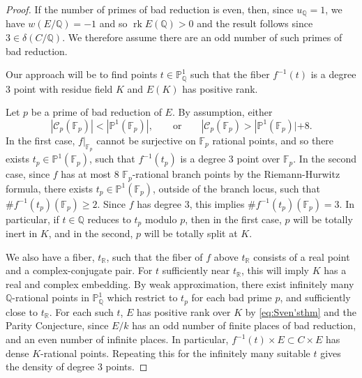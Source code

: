\documentclass[a4paper,11pt]{amsart}
\theoremstyle{plain}
\theoremstyle{remark}
\renewcommand{\P}{\mathbb{P}}
\newcommand{\rk}{\operatorname{rk}}
\newcommand{\dendegs}{\delta}
\begin{document}
\begin{proof}
If the number of primes of bad reduction is even, then, since \(u_{\mathbb{Q}} = 1\), we have \(w(E/\mathbb{Q}) = -1\) and so \(\rk E(\mathbb{Q}) > 0\) and the result follows since \(3 \in \dendegs(C/\mathbb{Q})\). 
We therefore assume there are an odd number of such primes of bad reduction. 

Our approach will be to find points $t \in \mathbb{P}^1_\mathbb{Q}$ such that the fiber $f^{-1}(t)$ is a degree \(3\) point with residue field \(K\) and $E(K)$ has positive rank.

Let \(p\) be a prime of bad reduction of $E$.  By assumption, either \[|\mathcal{C}_p(\mathbb{F}_p)| < |\mathbb{P}^1(\mathbb{F}_p)|, \qquad \text{or} \qquad |\mathcal{C}_p(\mathbb{F}_p) > |\mathbb{P}^1(\mathbb{F}_p)| + 8 .\] 
In the first case, $f|_{\mathbb{F}_p}$ cannot be surjective on $\mathbb{F}_p$ rational points, and so there exists \(t_p \in \P^1(\mathbb{F}_p)\), such that $f^{-1}(t_p)$ is a degree 3 point over $\mathbb{F}_p$. 
In the second case, since $f$ has at most 8 \(\mathbb{F}_p\)-rational branch points by the Riemann-Hurwitz formula, there exists \(t_p \in \P^1(\mathbb{F}_p)\), outside of the branch locus, such that \(\#f^{-1}(t_p)(\mathbb{F}_p) \geq 2\). Since $f$ has degree 3, this implies \(\#f^{-1}(t_p)(\mathbb{F}_p) = 3\). In particular, if $t \in \mathbb{Q}$ reduces to $t_p$ modulo $p$, then in the first case, $p$ will be totally inert in $K$, and in the second, $p$ will be totally split at $K$.

We also have a fiber, $t_{\mathbb{R}}$, such that the fiber of $f$ above $t_{\mathbb{R}}$ consists of a real point and a complex-conjugate pair. For $t$ sufficiently near $t_{\mathbb{R}}$, this will imply $K$ has a real and complex embedding.
By weak approximation, there exist infinitely many $\mathbb{Q}$-rational points in $\mathbb{P}^1_\mathbb{Q}$ which restrict to $t_p$ for each bad prime $p$, and sufficiently close to $t_{\mathbb{R}}$.
For each such $t$, $E$ has positive rank over $K$ by \eqref{eq:Sven'sthm} and the Parity Conjecture, since $E / k$ has an odd number of finite places of bad reduction, and an even number of infinite places. In particular, $f^{-1}(t) \times E \subset C \times E$ has dense $K$-rational points. Repeating this for the infinitely many suitable $t$ gives the density of degree 3 points.
\end{proof}
\end{document}
